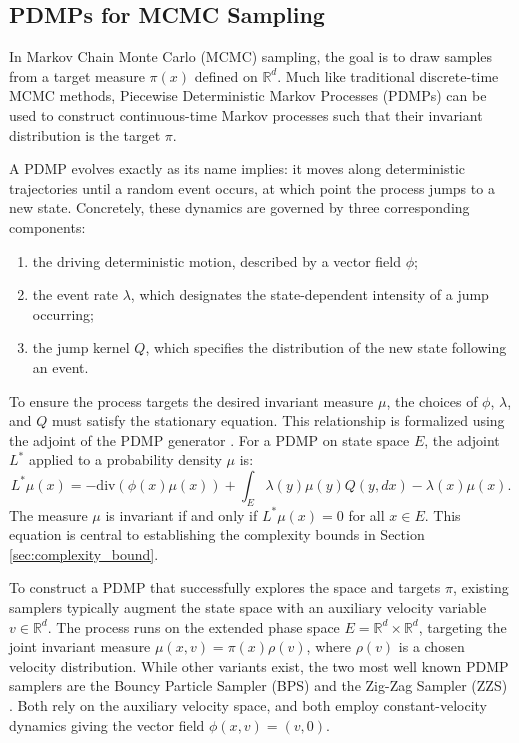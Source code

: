 \documentclass{article}
\begin{document}
\subsection{PDMPs for MCMC Sampling}
\label{sec:pdmp_for_sampling}

In Markov Chain Monte Carlo (MCMC) sampling, the goal is to draw samples from a target measure $\pi(x)$ defined on $\mathbb{R}^d$. Much like traditional discrete-time MCMC methods, Piecewise Deterministic Markov Processes (PDMPs) \cite{fearnhead2018piecewise} can be used to construct continuous-time Markov processes such that their invariant distribution is the target $\pi$.

A PDMP evolves exactly as its name implies: it moves along deterministic trajectories until a random event occurs, at which point the process jumps to a new state. Concretely, these dynamics are governed by three corresponding components:
\begin{enumerate}
    \item[i)] the driving deterministic motion, described by a vector field $\phi$;
    \item[ii)] the event rate $\lambda$, which designates the state-dependent intensity of a jump occurring;
    \item[iii)] the jump kernel $Q$, which specifies the distribution of the new state following an event.
\end{enumerate}

To ensure the process targets the desired invariant measure $\mu$, the choices of $\phi$, $\lambda$, and $Q$ must satisfy the stationary equation. This relationship is formalized using the adjoint of the PDMP generator \cite{fearnhead2018piecewise}. For a PDMP on state space $E$, the adjoint $L^*$ applied to a probability density $\mu$ is:
\begin{equation}
    \label{eq:adjoint-generator}
    L^*\mu(x) = -\text{div}(\phi(x)\mu(x)) + \int_E \lambda(y) \mu(y) Q(y, dx) - \lambda(x)\mu(x).
\end{equation}
The measure $\mu$ is invariant if and only if $L^*\mu(x) = 0$ for all $x \in E$. This equation is central to establishing the complexity bounds in Section \ref{sec:complexity_bound}.

To construct a PDMP that successfully explores the space and targets $\pi$, existing samplers typically augment the state space with an auxiliary velocity variable $v \in \mathbb{R}^d$. The process runs on the extended phase space $E = \mathbb{R}^d \times \mathbb{R}^d$, targeting the joint invariant measure $\mu(x, v) = \pi(x)\rho(v)$, where $\rho(v)$ is a chosen velocity distribution. 
%
While other variants exist, the two most well known PDMP samplers are the Bouncy Particle Sampler (BPS) \cite{bouchard2018bouncy} and the Zig-Zag Sampler (ZZS) \cite{bierkens2019zig}. Both rely on the auxiliary velocity space, and both employ constant-velocity dynamics giving the vector field $\phi(x,v) = (v, 0)$.
\end{document}
